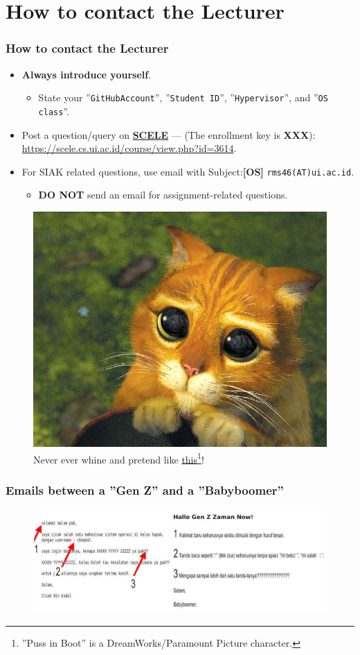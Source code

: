 \documentclass[aspectratio=169, xcolor=table, notheorems, hyperref={pdfpagelabels=false}]{beamer}
\begin{document}
\section{How to contact the Lecturer}
\begin{frame}[fragile]
\frametitle{How to contact the Lecturer}
\begin{itemize}
\item \textbf{Always introduce yourself}.
\begin{itemize}
\item State your ''\texttt{GitHubAccount}'', ''\texttt{Student ID}'', ''\texttt{Hypervisor}'', and ''\texttt{OS class}''.
\end{itemize}
\item Post a question/query on 
\href{https://scele.cs.ui.ac.id/course/view.php?id=3743}{\textbf{SCELE}} ---
(The enrollment key is \textbf{XXX}):
\href{https://scele.cs.ui.ac.id/course/view.php?id=3743}{https://scele.cs.ui.ac.id/course/view.php?id=3614}.
\item For SIAK related questions, use email with
Subject:\textbf{[OS]} \texttt{rms46(AT)ui.ac.id}. 
\begin{itemize}
\item \textbf{DO NOT} send an email for assignment-related questions.
\end{itemize}
\end{itemize}

\begin{figure}
\includegraphics[width=0.27\linewidth]{os00-pib}
\caption{Never ever whine and pretend like 
         \href{https://rahmatm.samik-ibrahim.vlsm.org/2013/12/puss-in-boots.html}{this}\footnote{''Puss in Boot'' is a DreamWorks/Paramount Picture character.}!}
\end{figure}
\end{frame}

\begin{frame}
\frametitle{Emails between a ''Gen Z'' and a ''Babyboomer''}
\begin{figure}
\includegraphics[width=1.01\linewidth]{os-millenial-mail}
\end{figure}
\end{frame}
\end{document}

